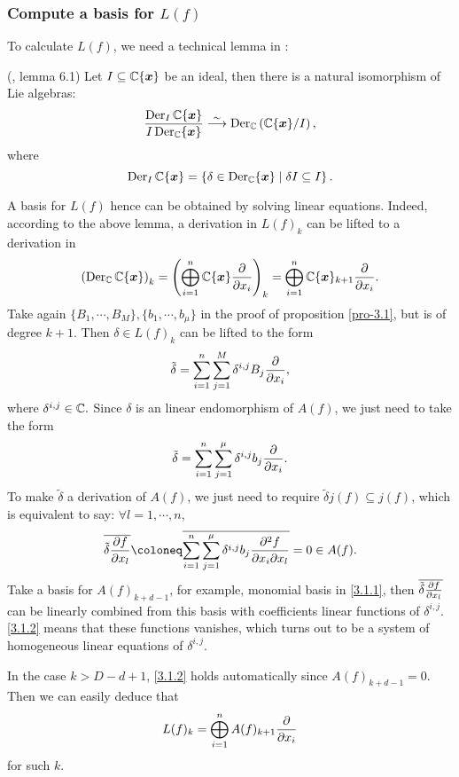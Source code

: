   \subsubsection{Compute a basis for \texorpdfstring{$L(f)$}{L(f)}}\label{sec-3.1.2}
  To calculate $L(f)$, we need a technical lemma in \cite{BN}:
  \begin{lemma}(\cite{BN}, lemma 6.1)\label{lem-3.2}
    Let $I \subseteq {\mathbb{C}}\{{\boldsymbol{x}}\}$ be an ideal, then there is a natural isomorphism of Lie algebras:
    \[\frac{\operatorname{Der}_I {\mathbb{C}}\{{\boldsymbol{x}}\}} {I \operatorname{Der}_{\mathbb{C}}\{ {\boldsymbol{x}}\} } \stackrel {\sim} \longrightarrow \operatorname{Der}_{\mathbb{C}}\left({\mathbb{C}}\{{\boldsymbol{x}}\}/I\right),\]
    where
    \[\operatorname{Der}_I {\mathbb{C}}\{{\boldsymbol{x}}\} = \left\{ \delta \in \operatorname{Der}_{\mathbb{C}}\{{\boldsymbol{x}}\} \mid \delta I \subseteq I\right\}.\]
  \end{lemma} 
  A basis for $L(f)$ hence can be obtained by solving linear equations. Indeed, according to the above lemma, a derivation in $L(f)_k$ can be lifted to a derivation in 
  \[\left( \operatorname{Der}_{\mathbb{C}} {\mathbb{C}}\{ {\boldsymbol{x}} \} \right)_k = \left( \bigoplus_{i=1}^n {\mathbb{C}}\{{\boldsymbol{x}}\} \frac{\partial }{\partial x_i} \right)_k = \bigoplus_{i=1}^n {\mathbb{C}}\{{\boldsymbol{x}}\}_{k+1} \frac{\partial }{\partial x_i}.\]
  Take again $\{B_1,\cdots, B_M\}, \{b_1,\cdots, b_\mu\}$ in the proof of proposition \ref{pro-3.1}, but is of degree $k+1$. Then $\delta \in L(f)_k$ can be lifted to the form
  \[\tilde \delta = \sum_{i=1}^n \sum_{j=1}^M \delta^{i,j} B_j \frac{\partial }{\partial x_i}, \]
  where $\delta^{i,j} \in {\mathbb{C}}.$ Since $\delta$ is an linear endomorphism  of  $A(f)$, we just need to take the form 
  \[\tilde \delta = \sum_{i=1}^n \sum_{j=1}^\mu \delta^{i,j} b_ j\frac{\partial }{\partial x_i}. \]
  To make $\tilde \delta $ a derivation of $A(f)$, we just need to require $\tilde \delta j(f) \subseteq j(f)$, which is equivalent to say:
  $\forall l = 1,\cdots, n$, 
  \begin{equation}\label{3.1.2}
    \overline{\tilde \delta \pd f {x_l} } \coloneq  
    \overline{ \sum_{i=1}^n \sum_{j=1}^\mu \delta^{i,j} b_ j\frac{\partial^2 f }{\partial x_i \partial x_l }} = 0 \in A(f).
  \end{equation}
  Take a basis for $A(f)_{k+d-1}$, for example, monomial basis in \eqref{3.1.1}, then $\overline{\tilde \delta \frac{\partial f}{\partial x_l} }$ can be linearly combined from this basis with coefficients linear functions of $\delta^{i,j}$. \eqref{3.1.2} means that these functions vanishes, which turns out to be a system of homogeneous linear equations of $\delta^{i,j}$.

  In the case $k>D-d+1$, \eqref{3.1.2} holds automatically since $A(f)_{k+d-1}=0$. Then we can easily deduce that 
  \[L(f)_k = \bigoplus_{i=1}^n A(f)_{k+1} \frac{\partial }{\partial x_i}\]
  for such $k$.

